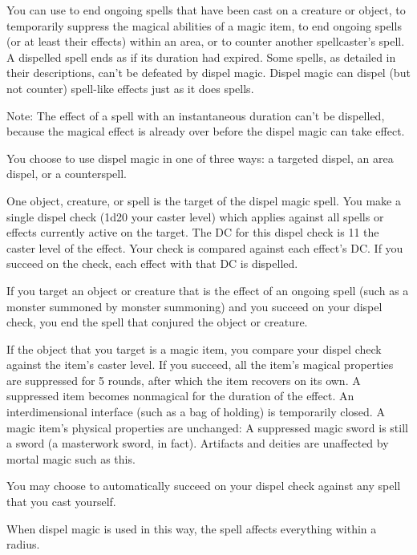 \begin{spelleffect}
  You can use  to end ongoing spells that have been cast on a creature or object, to temporarily suppress the magical abilities of a magic item, to end ongoing spells (or at least their effects) within an area, or to counter another spellcaster's spell. A dispelled spell ends as if its duration had expired. Some spells, as detailed in their descriptions, can't be defeated by dispel magic. Dispel magic can dispel (but not counter) spell-like effects just as it does spells.
  \par Note: The effect of a spell with an instantaneous duration can't be dispelled, because the magical effect is already over before the dispel magic can take effect. 
  \par You choose to use dispel magic in one of three ways: a targeted dispel, an area dispel, or a counterspell.

  \par {} One object, creature, or spell is the target of the dispel magic spell. You make a single dispel check (1d20 \add your caster level) which applies against all spells or effects currently active on the target. The DC for this dispel check is 11 \add the caster level of the effect. Your check is compared against each effect's DC. If you succeed on the check, each effect with that DC is dispelled.

  \par If you target an object or creature that is the effect of an ongoing spell (such as a monster summoned by monster summoning) and you succeed on your dispel check, you end the spell that conjured the object or creature.
  \par If the object that you target is a magic item, you compare your dispel check against the item's caster level. If you succeed, all the item's magical properties are suppressed for 5 rounds, after which the item recovers on its own. A suppressed item becomes nonmagical for the duration of the effect. An interdimensional interface (such as a bag of holding) is temporarily closed. A magic item's physical properties are unchanged: A suppressed magic sword is still a sword (a masterwork sword, in fact). Artifacts and deities are unaffected by mortal magic such as this.
  \par You may choose to automatically succeed on your dispel check against any spell that you cast yourself.
  \par {} When dispel magic is used in this way, the spell affects everything within a \areamed radius.


\end{spelleffect}
